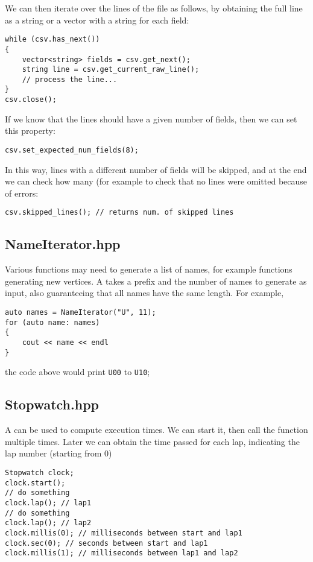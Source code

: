 We can then iterate over the lines of the file as follows, by obtaining the full line as a string or a vector with a string for each field:
\begin{lstlisting}[style=c++]
while (csv.has_next())
{
    vector<string> fields = csv.get_next();
    string line = csv.get_current_raw_line();
    // process the line...
}
csv.close();
\end{lstlisting}

If we know that the lines should have a given number of fields, then we can set this property:
\begin{lstlisting}[style=c++]
csv.set_expected_num_fields(8);
\end{lstlisting}
In this way, lines with a different number of fields will be skipped, and at the end we can check how many (for example to check that no lines were omitted because of errors:
\begin{lstlisting}[style=c++]
csv.skipped_lines(); // returns num. of skipped lines
\end{lstlisting}


\subsection{NameIterator.hpp}

Various functions may need to generate a list of names, for example functions generating new vertices. A  takes a prefix and the number of names to generate as input, also guaranteeing that all names have the same length. For example,
\begin{lstlisting}[style=c++]
auto names = NameIterator("U", 11);
for (auto name: names)
{
    cout << name << endl
}
\end{lstlisting}
the code above would print \texttt{U00} to \texttt{U10};


\subsection{Stopwatch.hpp}

A  can be used to compute execution times. We can start it, then call the  function multiple times.
Later we can obtain the time passed for each lap, indicating the lap number (starting from 0)
\begin{lstlisting}[style=c++]
Stopwatch clock;
clock.start();
// do something
clock.lap(); // lap1
// do something
clock.lap(); // lap2
clock.millis(0); // milliseconds between start and lap1
clock.sec(0); // seconds between start and lap1
clock.millis(1); // milliseconds between lap1 and lap2
\end{lstlisting}

